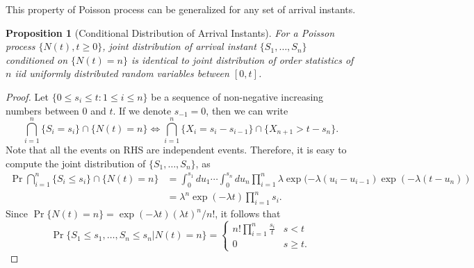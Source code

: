 \documentclass[a4paper,10pt]{article}
\theoremstyle{plain}
\newtheorem{prop}[thm]{Proposition}
\theoremstyle{definition}
\begin{document}
This property of Poisson process can be generalized for any set of arrival instants.
\begin{prop}[Conditional Distribution of Arrival Instants] For a Poisson process $\{N(t), t\geqslant 0\}$, joint distribution of arrival instant $\{S_1, \ldots, S_n\}$ conditioned on $\{N(t)=n\}$ is identical to joint distribution of order statistics of $n$ \emph{iid} uniformly distributed random variables between $[0,t]$.
\end{prop}
\begin{proof} Let $\{ 0 \leq s_i \leq t: 1 \leqslant i \leqslant n\}$ be a sequence of non-negative increasing numbers between $0$ and $t$. If we denote $s_{-1} = 0$, then we can write 
\begin{equation*}
\bigcap_{i=1}^n\{S_i = s_i\}\cap\{N(t) = n\} \iff \bigcap_{i=1}^n\{X_i = s_i - s_{i-1}\}\cap\{X_{n+1} > t - s_n\}.
\end{equation*}
Note that all the events on RHS are independent events. Therefore, it is easy to compute the joint distribution of $\{S_1,\ldots, S_n\}$, as 
\begin{align*}
\Pr\bigcap_{i=1}^n\{S_i \leq s_i\}\cap\{N(t) = n\} &= \int_{0}^{s_1}du_1\cdots\int_{0}^{s_n}du_n \prod_{i=1}^n\lambda \exp(-\lambda (u_i-u_{i-1})\exp(-\lambda (t-u_n))\\
&= \lambda^n\exp(-\lambda t)\prod_{i=1}^ns_i.
\end{align*}
Since $\Pr\{N(t) = n\} = \exp(-\lambda t)(\lambda t)^n/n! $, it follows that 
\begin{equation*}
\Pr\{S_1 \leq s_1,\ldots, S_n\leq s_n | N(t) = n\} = 
\begin{cases}
n!\prod_{i=1}^n\frac{s_i}{t} & s < t\\ 
0 & s \geq t.
\end{cases}
\end{equation*}

\end{proof}
\end{document}
